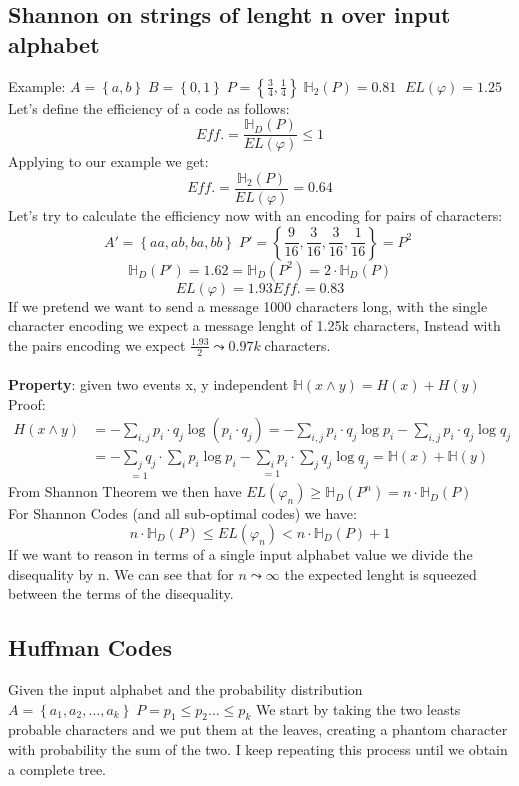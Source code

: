     \subsection*{Shannon on strings of lenght n over input alphabet}
    Example: $A=\left\{ a,b \right\} \;B=\left\{ 0,1 \right\}\; P=\left\{ \frac{3}{4}, \frac{1}{4} \right\}\; \mathbb{H}_2(P)=0.81\;$ 
    $EL(\varphi) = 1.25$\\
    Let's define the efficiency of a code as follows:
    $$Eff. = \frac{\mathbb{H}_D(P)}{EL(\varphi)}\leq 1$$
    Applying to our example we get: 
    $$Eff. = \frac{\mathbb{H}_2(P)}{EL(\varphi)}=0.64$$
    Let's try to calculate the efficiency now with an encoding for pairs of characters:
    $$A'=\left\{ aa, ab,ba,bb \right\}\; P'=\left\{ \frac{9}{16}, \frac{3}{16}, \frac{3}{16}, \frac{1}{16} \right\} = P^2 \;$$ $$
    \mathbb{H}_D(P')= 1.62 = \mathbb{H}_D(P^2) = 2\cdot \mathbb{H}_D(P)$$
    $$EL(\varphi) = 1.93 Eff. = 0.83$$
    If we pretend we want to send a message 1000 characters long, with the single character encoding we expect a message lenght of 1.25k characters,
    Instead with the pairs encoding we expect $\frac{1.93}{2} \leadsto 0.97k \;$characters.\\\\
    \textbf{Property}: given two events x, y independent
    $\mathbb{H}(x \wedge y) = H(x) + H(y)$
    Proof:
    \begin{align*}
        H(x \wedge y ) &= -\sum_{i,j}^{}{p_i \cdot q_j \log{(p_i\cdot q_j)}} = - \sum_{i,j}^{}{p_i \cdot q_j \log{p_i}} - \sum_{i,j}^{}{p_i\cdot q_j \log{q_j}}\\
        &= -\underset{=1}{\sum_{j}{q_j}} \cdot \sum_{i}^{}{p_i \log{p_i}} - \underset{=1}{\sum_{i}{p_i}} \cdot \sum_{j}{q_j \log{q_j}} = \mathbb{H}(x) + \mathbb{H}(y)
    \end{align*}
    From Shannon Theorem we then have $EL(\varphi_n) \geq \mathbb{H}_D(P^n) = n\cdot \mathbb{H}_D(P)$\\
    For Shannon Codes (and all sub-optimal codes) we have:
    $$ n\cdot \mathbb{H}_D(P) \leq EL(\varphi_n) < n\cdot \mathbb{H}_D(P)+1$$ If we want to reason in terms of a single input alphabet value
    we divide the disequality by n. We can see that for $n \leadsto \infty $ the expected lenght is squeezed between the terms of the disequality.



    \subsection*{Huffman Codes}
    Given the input alphabet and the probability distribution
    $A = \left\{ a_1, a_2, \ldots, a_k \right\} \; P={p_1\leq p_2 \ldots \leq p_k}$
    We start by taking the two leasts probable characters and we put them at the leaves, creating a phantom character with probability
    the sum of the two. I keep repeating this process until we obtain a complete tree.

